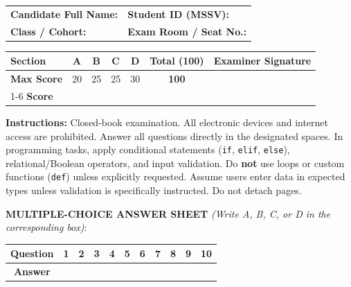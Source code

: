 \documentclass[11pt,a4paper]{article}
\begin{document}
\begin{headerbox}
\begin{tabular*}{\textwidth}{@{\extracolsep{\fill}}ll@{}}
  \textbf{Candidate Full Name:} \dotfill & \textbf{Student ID (MSSV):} \dotfill \\[0.2em]
  \textbf{Class / Cohort:} \dotfill & \textbf{Exam Room / Seat No.:} \dotfill
\end{tabular*}

\vspace{0.2em}
\renewcommand{\arraystretch}{1.05}
\setlength{\tabcolsep}{4.5pt}
\centering
\begin{tabular}{|l|c|c|c|c||c|c|}
\hline
\textbf{Section} & \textbf{A} & \textbf{B} & \textbf{C} & \textbf{D} & \textbf{Total (100)} & \textbf{Examiner Signature} \\
\hline
\textbf{Max Score} & 20 & 25 & 25 & 30 & \textbf{100} & \\[0.3em]
\cline{1-6}
\textbf{Score} & & & & & & \\[0.4em]
\hline
\end{tabular}

\vspace{0.15em}
\raggedright
\scriptsize
\textbf{Instructions:} Closed-book examination. All electronic devices and internet access are prohibited. Answer all questions directly in the designated spaces. In programming tasks, apply conditional statements (\texttt{if}, \texttt{elif}, \texttt{else}), relational/Boolean operators, and input validation. Do \textbf{not} use loops or custom functions (\texttt{def}) unless explicitly requested. Assume users enter data in expected types unless validation is specifically instructed. Do not detach pages.
\end{headerbox}

\vspace{1mm}
\noindent
\textbf{MULTIPLE-CHOICE ANSWER SHEET} \textit{(Write A, B, C, or D in the corresponding box)}:
\begin{center}
\setlength{\tabcolsep}{5pt}
\renewcommand{\arraystretch}{1.0}
\begin{tabular}{|c|c|c|c|c|c|c|c|c|c|c|}
\hline
\textbf{Question} & \textbf{1} & \textbf{2} & \textbf{3} & \textbf{4} & \textbf{5} & \textbf{6} & \textbf{7} & \textbf{8} & \textbf{9} & \textbf{10} \\
\hline
\textbf{Answer} & & & & & & & & & & \\[1.8mm]
\hline
\end{tabular}
\end{center}
\vspace{-2.5mm}
\end{document}
